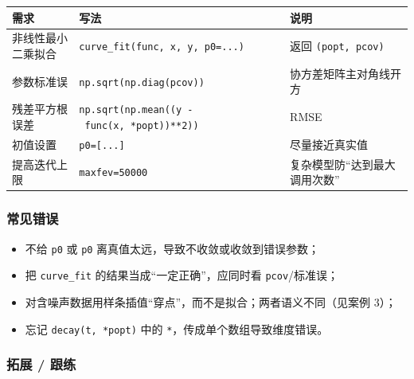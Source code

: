 {\def\LTcaptype{none} %
\begin{longtable}[]{@{}
  >{\raggedright\arraybackslash}p{}
  >{\raggedright\arraybackslash}p{}
  >{\raggedright\arraybackslash}p{}@{}}
\toprule\noalign{}
\begin{minipage}[b]{\linewidth}\raggedright
需求
\end{minipage} & \begin{minipage}[b]{\linewidth}\raggedright
写法
\end{minipage} & \begin{minipage}[b]{\linewidth}\raggedright
说明
\end{minipage} \\
\midrule\noalign{}
\endhead
\bottomrule\noalign{}
\endlastfoot
非线性最小二乘拟合 & \texttt{curve\_fit(func,\ x,\ y,\ p0=...)} & 返回
\texttt{(popt,\ pcov)} \\
参数标准误 & \texttt{np.sqrt(np.diag(pcov))} & 协方差矩阵主对角线开方 \\
残差平方根误差 & \texttt{np.sqrt(np.mean((y\ -\ func(x,\ *popt))**2))} &
RMSE \\
初值设置 & \texttt{p0={[}...{]}} & 尽量接近真实值 \\
提高迭代上限 & \texttt{maxfev=50000} & 复杂模型防``达到最大调用次数'' \\
\end{longtable}
}

\subsubsection{常见错误}\label{ux5e38ux89c1ux9519ux8bef-15}

\begin{itemize}
\tightlist
\item
  不给 \texttt{p0} 或 \texttt{p0}
  离真值太远，导致不收敛或收敛到错误参数；
\item
  把 \texttt{curve\_fit} 的结果当成``一定正确''，应同时看
  \texttt{pcov}/标准误；
\item
  对含噪声数据用样条插值``穿点''，而不是拟合；两者语义不同（见案例 3）；
\item
  忘记 \texttt{decay(t,\ *popt)} 中的
  \texttt{*}，传成单个数组导致维度错误。
\end{itemize}

\subsubsection{拓展 / 跟练}\label{ux62d3ux5c55-ux8ddfux7ec3-4}

